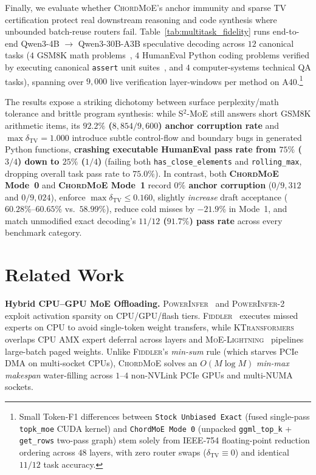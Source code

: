 \documentclass[10pt,twocolumn]{article}
\theoremstyle{definition}
\begin{document}
Finally, we evaluate whether \textsc{ChordMoE}'s anchor immunity and sparse TV certification protect real downstream reasoning and code synthesis where unbounded batch-reuse routers fail. Table~\ref{tab:multitask_fidelity} runs end-to-end Qwen3-4B $\to$ Qwen3-30B-A3B speculative decoding across $12$ canonical tasks ($4$ GSM8K math problems~\cite{cobbe2021gsm8k}, $4$ HumanEval Python coding problems verified by executing canonical \texttt{assert} unit suites~\cite{chen2021humaneval}, and $4$ computer-systems technical QA tasks), spanning over $9,000$ live verification layer-windows per method on A40.\footnote{Small Token-F1 differences between \texttt{Stock Unbiased Exact} (fused single-pass \texttt{topk\_moe} CUDA kernel) and \texttt{ChordMoE Mode 0} (unpacked \texttt{ggml\_top\_k} + \texttt{get\_rows} two-pass graph) stem solely from IEEE-754 floating-point reduction ordering across $48$ layers, with zero router swaps ($\delta_{\mathrm{TV}} \equiv 0$) and identical $11/12$ task accuracy.}

The results expose a striking dichotomy between surface perplexity/math tolerance and brittle program synthesis: while \textsc{S$^2$-MoE} still answers short GSM8K arithmetic items, its \textbf{$92.2\%$ ($8,854/9,600$) anchor corruption rate} and $\max \delta_{\mathrm{TV}} = 1.000$ introduce subtle control-flow and boundary bugs in generated Python functions, \textbf{crashing executable HumanEval pass rate from $75\%$ ($3/4$) down to $25\%$ ($1/4$)} (failing both \texttt{has\_close\_elements} and \texttt{rolling\_max}, dropping overall task pass rate to $75.0\%$). In contrast, both \textbf{\textsc{ChordMoE} Mode~0} and \textbf{\textsc{ChordMoE} Mode~1} record \textbf{$0\%$ anchor corruption} ($0/9,312$ and $0/9,024$), enforce $\max \delta_{\mathrm{TV}} \le 0.160$, slightly \emph{increase} draft acceptance ($60.28\%\text{--}60.65\%$ vs.\ $58.99\%$), reduce cold misses by $-21.9\%$ in Mode~1, and match unmodified exact decoding's \textbf{$11/12$ ($91.7\%$) pass rate} across every benchmark category.

\section{Related Work}
\label{sec:related}

\noindent\textbf{Hybrid CPU--GPU MoE Offloading.}
\textsc{PowerInfer}~\cite{song2024powerinfer} and \textsc{PowerInfer-2}~\cite{xue2024powerinfer2} exploit activation sparsity on CPU/GPU/flash tiers. \textsc{Fiddler}~\cite{kamahori2025fiddler} executes missed experts on CPU to avoid single-token weight transfers, while \textsc{KTransformers}~\cite{chen2025ktransformers} overlaps CPU AMX expert deferral across layers and \textsc{MoE-Lightning}~\cite{cao2025moelightning} pipelines large-batch paged weights. Unlike \textsc{Fiddler}'s \emph{min-sum} rule (which starves PCIe DMA on multi-socket CPUs), \textsc{ChordMoE} solves an $O(M \log M)$ \emph{min-max makespan} water-filling across $1\text{--}4$ non-NVLink PCIe GPUs and multi-NUMA sockets.
\end{document}
